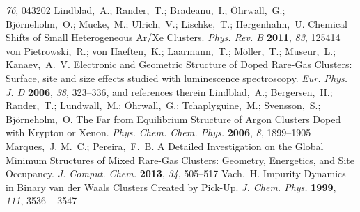\documentclass[journal=jpccck,manuscript=article]{achemso}
\begin{document}
\begin{mcitethebibliography}{73}
  \emph{76}, 043202\relax
\mciteBstWouldAddEndPuncttrue
\mciteSetBstMidEndSepPunct{\mcitedefaultmidpunct}
{\mcitedefaultendpunct}{\mcitedefaultseppunct}\relax
\EndOfBibitem
{}
Lindblad,~A.; Rander,~T.; Bradeanu,~I.; \"Ohrwall,~G.; Bj\"orneholm,~O.;
  Mucke,~M.; Ulrich,~V.; Lischke,~T.; Hergenhahn,~U. Chemical Shifts of Small
  Heterogeneous Ar/Xe Clusters. \emph{Phys. Rev. B} \textbf{2011}, \emph{83},
  125414\relax
\mciteBstWouldAddEndPuncttrue
\mciteSetBstMidEndSepPunct{\mcitedefaultmidpunct}
{\mcitedefaultendpunct}{\mcitedefaultseppunct}\relax
\EndOfBibitem
{}
von Pietrowski,~R.; von Haeften,~K.; Laarmann,~T.; M\"oller,~T.; Museur,~L.;
  Kanaev,~A.~V. Electronic and Geometric Structure of Doped Rare-Gas Clusters:
  Surface, site and size effects studied with luminescence spectroscopy.
  \emph{Eur. Phys. J. D} \textbf{2006}, \emph{38}, 323--336, and references
  therein\relax
\mciteBstWouldAddEndPuncttrue
\mciteSetBstMidEndSepPunct{\mcitedefaultmidpunct}
{\mcitedefaultendpunct}{\mcitedefaultseppunct}\relax
\EndOfBibitem
{}
Lindblad,~A.; Bergersen,~H.; Rander,~T.; Lundwall,~M.; \"Ohrwall,~G.;
  Tchaplyguine,~M.; Svensson,~S.; Bj\"orneholm,~O. The Far from Equilibrium
  Structure of Argon Clusters Doped with Krypton or Xenon. \emph{Phys. Chem.
  Chem. Phys.} \textbf{2006}, \emph{8}, 1899--1905\relax
\mciteBstWouldAddEndPuncttrue
\mciteSetBstMidEndSepPunct{\mcitedefaultmidpunct}
{\mcitedefaultendpunct}{\mcitedefaultseppunct}\relax
\EndOfBibitem
{}
Marques,~J. M.~C.; Pereira,~F.~B. A Detailed Investigation on the Global
  Minimum Structures of Mixed Rare-Gas Clusters: Geometry, Energetics, and Site
  Occupancy. \emph{J. Comput. Chem.} \textbf{2013}, \emph{34}, 505--517\relax
\mciteBstWouldAddEndPuncttrue
\mciteSetBstMidEndSepPunct{\mcitedefaultmidpunct}
{\mcitedefaultendpunct}{\mcitedefaultseppunct}\relax
\EndOfBibitem
{}
Vach,~H. Impurity Dynamics in Binary van der Waals Clusters Created by Pick-Up.
  \emph{J. Chem. Phys.} \textbf{1999}, \emph{111}, 3536 -- 3547\relax
\mciteBstWouldAddEndPuncttrue
\mciteSetBstMidEndSepPunct{\mcitedefaultmidpunct}
{\mcitedefaultendpunct}{\mcitedefaultseppunct}\relax

\end{mcitethebibliography}
\end{document}
